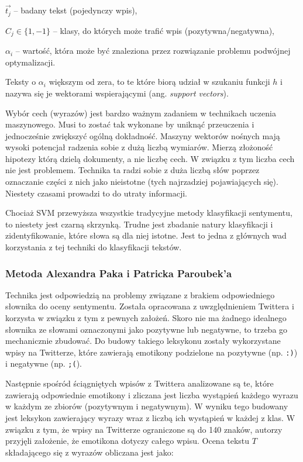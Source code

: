 $\vec{t_j}$ -- badany tekst (pojedynczy wpis),

$C_j \in \{1, -1\}$ -- klasy, do których może trafić wpis (pozytywna/negatywna),

$\alpha_i$ -- wartość, która może być znaleziona przez rozwiązanie problemu
podwójnej optymalizacji.

\bigskip

Teksty o $\alpha_i$ większym od zera, to te które biorą udział
w szukaniu funkcji $h$ i nazywa się je wektorami wspierającymi 
(ang. \textit{support vectors}).

Wybór cech (wyrazów) jest bardzo ważnym zadaniem w technikach uczenia maszynowego.
Musi to zostać tak wykonane by uniknąć przeuczenia i jednocześnie zwiększyć
ogólną dokładność. Maszyny wektorów nośnych mają wysoki potencjał radzenia
sobie z dużą liczbą wymiarów. Mierzą złożoność hipotezy którą dzielą dokumenty, 
a nie liczbę cech. W związku z tym liczba cech nie jest problemem.
Technika ta radzi sobie z duża liczbą słów poprzez oznaczanie części z nich jako
nieistotne (tych najrzadziej pojawiających się). Niestety czasami prowadzi to 
do utraty informacji. 

Chociaż SVM przewyższa wszystkie tradycyjne metody klasyfikacji sentymentu,
to niestety jest czarną skrzynką. Trudne jest zbadanie natury klasyfikacji i
zidentyfikowanie, które słowa są dla niej istotne. Jest to jedna z głównych wad
korzystania z tej techniki do klasyfikacji tekstów. 

\subsubsection{Metoda Alexandra Paka i Patricka Paroubek'a}
\label{subsubsection:pakandparoubek}
Technika jest odpowiedzią na problemy związane z brakiem odpowiedniego słownika
do oceny sentymentu. Została opracowana z uwzględnieniem Twittera i korzysta
w związku z tym z pewnych założeń. Skoro nie ma żadnego idealnego słownika
ze słowami oznaczonymi jako pozytywne lub negatywne, to trzeba go mechanicznie
zbudować. Do budowy takiego leksykonu zostały wykorzystane wpisy na Twitterze,
które zawierają emotikony podzielone na pozytywne (np. \texttt{:)}) i 
negatywne (np. \texttt{;(}). 

Następnie spośród ściągniętych wpisów z Twittera analizowane są te,
które zawierają odpowiednie emotikony i zliczana jest liczba wystąpień
każdego wyrazu w każdym ze zbiorów (pozytywnym i negatywnym).
W wyniku tego budowany jest leksykon zawierający wyrazy wraz z liczbą
ich wystąpień w każdej z klas.
W związku z tym, że wpisy na Twitterze ograniczone są do 140 znaków, autorzy przyjęli
założenie, że emotikona dotyczy całego wpisu. 
Ocena tekstu $T$ składającego się z wyrazów obliczana jest jako:

